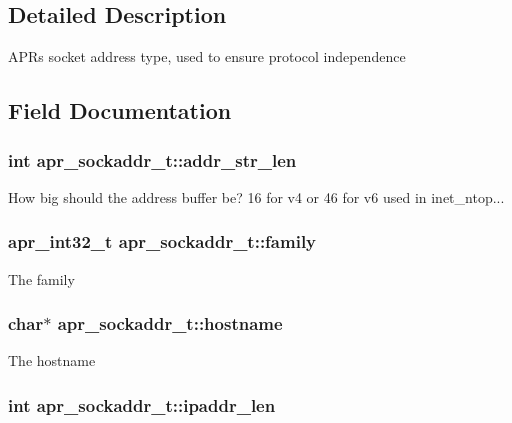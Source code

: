 \subsection{Detailed Description}
A\-P\-Rs socket address type, used to ensure protocol independence 

\subsection{Field Documentation}
\hypertarget{structapr__sockaddr__t_a8f7cda5562e904a1398ed5a4a6f0a9d9}{
\subsubsection[{addr\-\_\-str\-\_\-len}]{\setlength{\rightskip}{0pt plus 5cm}int apr\-\_\-sockaddr\-\_\-t\-::addr\-\_\-str\-\_\-len}}\label{structapr__sockaddr__t_a8f7cda5562e904a1398ed5a4a6f0a9d9}
How big should the address buffer be? 16 for v4 or 46 for v6 used in inet\-\_\-ntop... \hypertarget{structapr__sockaddr__t_ac17f6e803928cfc29069a6e62dcb3a52}{
\subsubsection[{family}]{\setlength{\rightskip}{0pt plus 5cm}apr\-\_\-int32\-\_\-t apr\-\_\-sockaddr\-\_\-t\-::family}}\label{structapr__sockaddr__t_ac17f6e803928cfc29069a6e62dcb3a52}
The family \hypertarget{structapr__sockaddr__t_a8e675775b407f25674aaa938a40de9cd}{
\subsubsection[{hostname}]{\setlength{\rightskip}{0pt plus 5cm}char$\ast$ apr\-\_\-sockaddr\-\_\-t\-::hostname}}\label{structapr__sockaddr__t_a8e675775b407f25674aaa938a40de9cd}
The hostname \hypertarget{structapr__sockaddr__t_a81be21b2eb968b83ca36183213c99867}{
\subsubsection[{ipaddr\-\_\-len}]{\setlength{\rightskip}{0pt plus 5cm}int apr\-\_\-sockaddr\-\_\-t\-::ipaddr\-\_\-len}}\label{structapr__sockaddr__t_a81be21b2eb968b83ca36183213c99867}
